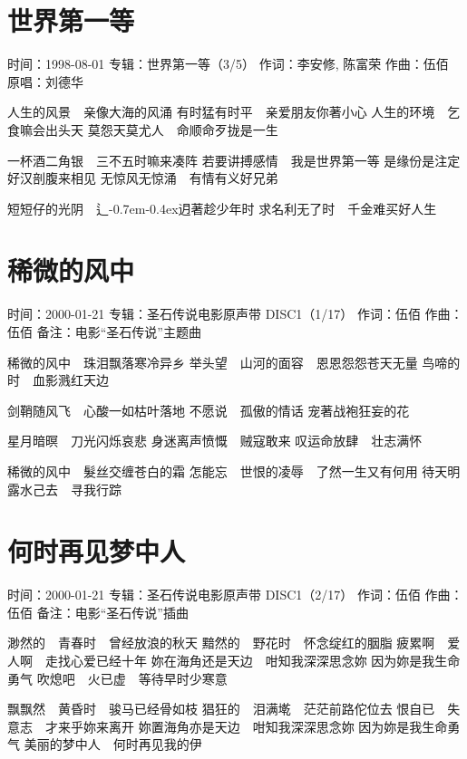 \documentclass[UTF8,a4paper,oneside,twocolumn,12pt]{ctexbook}
\newcommand{\infopair}[2]{\textbullet #1：#2}
\newcommand{\zc}[1][伍佰]{\infopair{作词}{#1}}
\newcommand{\zq}[1][伍佰]{\infopair{作曲}{#1}}
\newcommand{\zj}[1]{\infopair{专辑}{#1}}
\newcommand{\yc}[1]{\infopair{原唱}{#1}}
\newcommand{\sj}[1]{\infopair{时间}{#1}}
\newcommand{\bz}[1]{\infopair{备注}{#1}}
\newcommand{\tshittho}{\hbox{辶\kern-0.7em\lower-0.4ex\hbox{\scalebox{0.7}{日}}}迌}
\newenvironment{info}{\begin{flushleft}\kaishu
	}
	{\end{flushleft}\normalsize\yahei\par}
\newenvironment{lyric}{
	}
{}
\begin{document}
\section{世界第一等}
\begin{info}
	\sj{1998-08-01}
	\zj{世界第一等（3/5）}
	\zc[李安修, 陈富荣]
	\zq
	\yc{刘德华}
\end{info}
\begin{lyric}
	人生的风景　亲像大海的风涌
	有时猛有时平　亲爱朋友你著小心
	人生的环境　乞食嘛会出头天
	莫怨天莫尤人　命顺命歹拢是一生

	一杯酒二角银　三不五时嘛来凑阵
	若要讲搏感情　我是世界第一等
	是缘份是注定　好汉剖腹来相见
	无惊风无惊涌　有情有义好兄弟

	短短仔的光阴　\tshittho{}著趁少年时
	求名利无了时　千金难买好人生
\end{lyric}

\section{稀微的风中}
\begin{info}
	\sj{2000-01-21}
	\zj{圣石传说电影原声带 DISC1（1/17）}
	\zc
	\zq
	\bz{电影“圣石传说”主题曲}
\end{info}
\begin{lyric}
	稀微的风中　珠泪飘落寒冷异乡
	举头望　山河的面容　恩恩怨怨苍天无量
	鸟啼的时　血影溅红天边

	剑鞘随风飞　心酸一如枯叶落地
	不愿说　孤傲的情话
	宠著战袍狂妄的花

	星月暗暝　刀光闪烁哀悲
	身迷离声愤慨　贼寇敢来
	叹运命放肆　壮志满怀

	稀微的风中　髮丝交缠苍白的霜
	怎能忘　世恨的凌辱　了然一生又有何用
	待天明露水己去　寻我行踪
\end{lyric}

\section{何时再见梦中人}
\begin{info}
	\sj{2000-01-21}
	\zj{圣石传说电影原声带 DISC1（2/17）}
	\zc
	\zq
	\bz{电影“圣石传说”插曲}
\end{info}
\begin{lyric}
	渺然的　青春时　曾经放浪的秋天
	黯然的　野花时　怀念绽红的胭脂
	疲累啊　爱人啊　走找心爱已经十年
	妳在海角还是天边　咁知我深深思念妳
	因为妳是我生命勇气
	吹熄吧　火已虚　等待早时少寒意

	飘飘然　黄昏时　骏马已经骨如枝
	猖狂的　泪满墘　茫茫前路佗位去
	恨自已　失意志　才来乎妳来离开
	妳置海角亦是天边　咁知我深深思念妳
	因为妳是我生命勇气
	美丽的梦中人　何时再见我的伊
\end{lyric}
\end{document}
